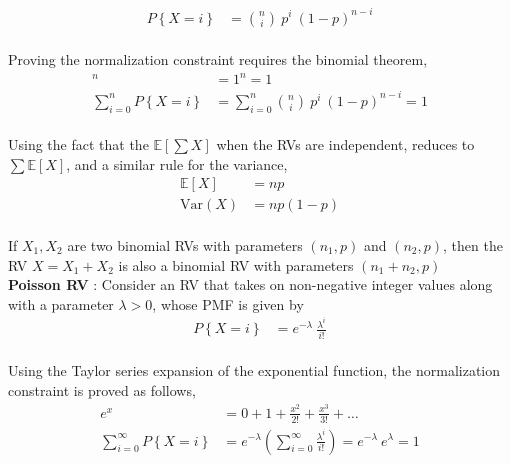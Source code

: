 \begin{align}
	P \left\{X = i\right\} &= \binom{n}{i}\ p^i \ (1-p)^{n-i}
\end{align} \\

Proving the normalization constraint requires the binomial theorem, \\
\begin{align}
	[p + (1-p)]^n &= 1^n = 1 \nonumber \\[1ex]
	\sum\limits_{i=0}^{n} P \left\{X = i\right\} &= \sum\limits_{i=0}^{n} \binom{n}{i}\ p^i \ (1-p)^{n-i}  = 1
\end{align} \\

Using the fact that the $ \mathbb{E}[\sum X] $ when the RVs are independent, reduces to $ \sum \mathbb{E}[X] $, and a similar rule for the variance, \\

\begin{align}
	\mathbb{E}[X] &= np \\[1ex]
	\mathrm{Var}(X) &= np(1-p)
\end{align} \\

If $ X_1, X_2 $ are two binomial RVs with parameters $ (n_1, p) $ and $ (n_2, p) $, then the RV $ X = X_1 + X_2 $ is also a binomial RV with parameters $ (n_1 + n_2, p) $ \\

\textbf{Poisson RV} : Consider an RV that takes on non-negative integer values along with a parameter $ \lambda > 0 $, whose PMF is given by \\


\begin{align}
	P \left\{X = i\right\} &= e^{-\lambda}\ \frac{\lambda^i}{i!}
\end{align}\\

Using the Taylor series expansion of the exponential function, the normalization constraint is proved as follows,\\


\begin{align}
	e^x &= 0 + 1 + \frac{x^2}{2!} + \frac{x^3}{3!} + \dots \nonumber \\[1ex]
	\sum\limits_{i=0}^{\infty} P \left\{X = i\right\} &= e^{-\lambda} \left(\sum\limits_{i=0}^{\infty} \frac{\lambda^i}{i!}\right) = e^{-\lambda} \ e^{\lambda} = 1
\end{align}\\

